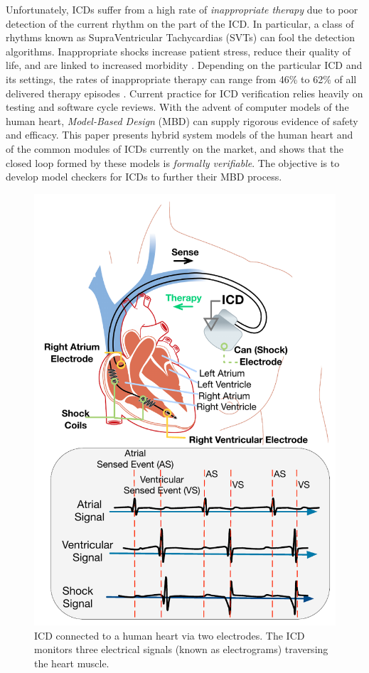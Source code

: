 Unfortunately, \acp{ICD} suffer from a high rate of \emph{inappropriate therapy} due to poor detection of the current rhythm on the part of the \ac{ICD}.
In particular, a class of rhythms known as SupraVentricular Tachycardias (SVTs) can fool the detection algorithms.
Inappropriate shocks increase patient stress, reduce their quality of life, and are linked to increased morbidity \cite{shock_mortality}.
Depending on the particular ICD and its settings, the rates of inappropriate therapy can range from 46\% to 62\% of all delivered therapy episodes \cite{GoldABBTB11_RIGHTresults}.
Current practice for \ac{ICD} verification relies heavily on testing and software cycle reviews.
With the advent of computer models of the human heart, \emph{Model-Based Design} (MBD) can supply rigorous evidence of safety and efficacy. 
This paper presents hybrid system models of the human heart and of the common modules of \acp{ICD} currently on the market, and shows that the closed loop formed by these models is \emph{formally verifiable}.
The objective is to develop model checkers for \acp{ICD} to further their MBD process.
\begin{figure}[t]
	\centering
	\includegraphics[scale=0.3]{figures/figICD}
	\vspace{-10pt}
	\caption{\small ICD connected to a human heart via two electrodes. The ICD monitors three electrical signals (known as electrograms) traversing the heart muscle.}
	\label{fig:icd}
	\vspace{-10pt}
\end{figure}

